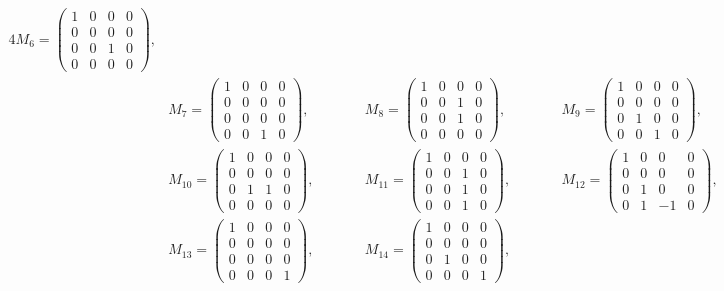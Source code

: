\documentclass[pdftex]{sigma}
\numberwithin{equation}{section}
\begin{document}
\begin{Example}
\begin{enumerate}
\begin{alignat*}{4}
M_6=\begin{pmatrix}1&0&0&0\\0&0&0&0\\0&0&1&0\\0&0&0&0\end{pmatrix},&\\
&M_7=\begin{pmatrix}1&0&0&0\\0&0&0&0\\0&0&0&0\\0&0&1&0\end{pmatrix},\qquad&&
M_8=\begin{pmatrix}1&0&0&0\\0&0&1&0\\0&0&1&0\\0&0&0&0\end{pmatrix},\qquad&&
M_9=\begin{pmatrix}1&0&0&0\\0&0&0&0\\0&1&0&0\\0&0&1&0\end{pmatrix},&\\
&M_{10}=\begin{pmatrix}1&0&0&0\\0&0&0&0\\0&1&1&0\\0&0&0&0\end{pmatrix},\qquad&&
M_{11}=\begin{pmatrix}1&0&0&0\\0&0&1&0\\0&0&1&0\\0&0&1&0\end{pmatrix},\qquad&&
M_{12}=\begin{pmatrix}1&0&0&0\\0&0&0&0\\0&1&0&0\\0&1&-1&0\end{pmatrix},&\\
&M_{13}=\begin{pmatrix}1&0&0&0\\0&0&0&0\\0&0&0&0\\0&0&0&1\end{pmatrix},\qquad&&
M_{14}=\begin{pmatrix}1&0&0&0\\0&0&0&0\\0&1&0&0\\0&0&0&1\end{pmatrix},\qquad&&

\end{alignat*}
\end{enumerate}
\end{Example}
\end{document}
